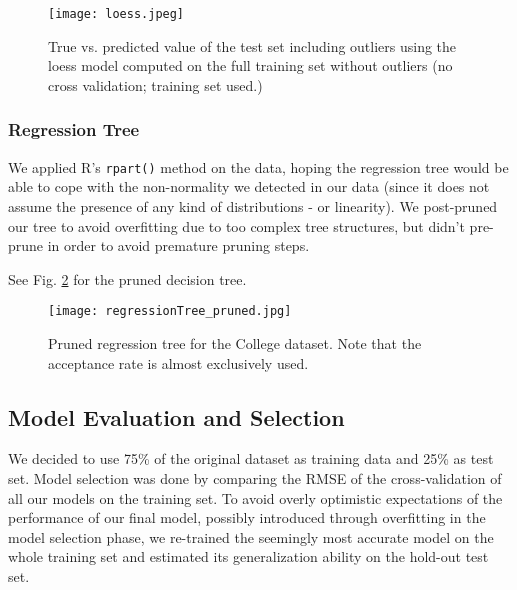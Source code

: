 \documentclass[a4paper]{article}
\begin{document}
 \begin{figure}[H]
 	\centering
 	\texttt{[image: loess.jpeg]}
 	\caption{\label{fig:loess} True vs. predicted value of the test set including outliers using the loess model computed on the full training set without outliers (no cross validation; training set used.)}
 \end{figure}

 \subsubsection{Regression Tree}
We applied R's \texttt{rpart()} method on the data, hoping the regression tree would be able to cope with the non-normality we detected in our data (since it does not assume the presence of any kind of distributions - or linearity). 
We post-pruned our tree to avoid overfitting due to too complex tree structures, but didn't pre-prune in order to avoid premature pruning steps.

See Fig. \ref{fig:reg_tree_pruned} for the pruned decision tree.

 \begin{figure}[H]
 	\centering
 	\texttt{[image: regressionTree\_pruned.jpg]}
 	\caption{\label{fig:reg_tree_pruned} Pruned regression tree for the College dataset. Note that the acceptance rate is almost exclusively used.}
 \end{figure}
 


 \subsection{Model Evaluation and Selection}

 We decided to use 75\% of the original dataset as training data and 25\% as test set. Model selection was done by comparing the RMSE of the cross-validation of all our models on the training set. To avoid overly optimistic expectations of the performance of our final model, possibly introduced through overfitting in the model selection phase, we re-trained the seemingly most accurate model on the whole training set and estimated its generalization ability on the hold-out test set.
\end{document}
